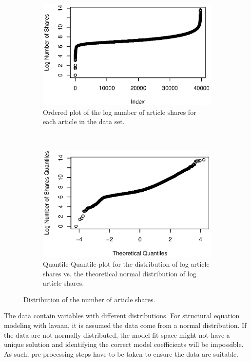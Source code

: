 \documentclass{article}
\begin{document}
\begin{figure}
    \begin{subfigure}[t]{0.45\textwidth}
        \includegraphics[width=\textwidth]{figs/zz-03-log-cumulative-plot-shares}
        \caption{Ordered plot of the log number of article shares for each article in the data set.}
    \end{subfigure}
    ~
    \begin{subfigure}[t]{0.45\textwidth}
        \includegraphics[width=\textwidth]{figs/zz-02-log-number-of-shares-quantiles}
        \caption{Quantile-Quantile plot for the distribution of log article shares vs. the theoretical normal distribution of log article shares.}
    \end{subfigure}
    
    \caption{Distribution of the number of article shares.}
    \label{fig:number_of_shares_distribution}
\end{figure}

The data contain variables with different distributions. For structural equation modeling with lavaan, it is assumed the data come from a normal distribution.
If the data are not normally distributed, the model fit space might not have a unique solution and identifying the correct model coefficients will be impossible.
As such, pre-processing steps have to be taken to ensure the data are suitable.
\end{document}
